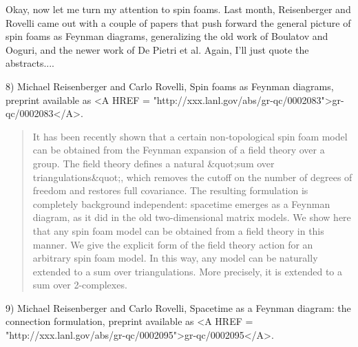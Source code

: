 Okay, now let me turn my attention to spin foams.  Last month, 
Reisenberger and Rovelli came out with a couple of papers that push
forward the general picture of spin foams as Feynman diagrams, 
generalizing the old work of Boulatov and Ooguri, and the newer
work of De Pietri et al.  Again, I'll just quote the abstracts....

8) Michael Reisenberger and Carlo Rovelli, Spin foams as Feynman diagrams,
preprint available as <A HREF = "http://xxx.lanl.gov/abs/gr-qc/0002083">gr-qc/0002083</A>.

\begin{quote}
     It has been recently shown that a certain non-topological spin foam
     model can be obtained from the Feynman expansion of a field theory
     over a group. The field theory defines a natural &quot;sum over
     triangulations&quot;, which removes the cutoff on the number of
     degrees of freedom and restores full covariance. The resulting
     formulation is completely background independent: spacetime emerges
     as a Feynman diagram, as it did in the old two-dimensional matrix
     models. We show here that any spin foam model can be obtained from
     a field theory in this manner. We give the explicit form of the
     field theory action for an arbitrary spin foam model. In this way,
     any model can be naturally extended to a sum over triangulations. 
     More precisely, it is extended to a sum over 2-complexes.
\end{quote}
    
9) Michael Reisenberger and Carlo Rovelli, Spacetime as a Feynman diagram:
the connection formulation, preprint available as <A HREF = "http://xxx.lanl.gov/abs/gr-qc/0002095">gr-qc/0002095</A>.

